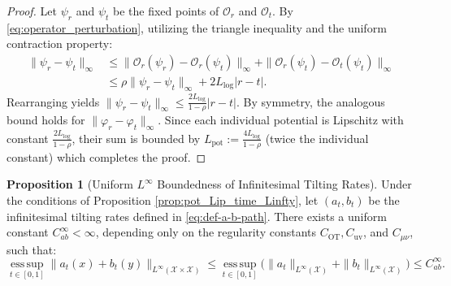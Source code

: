 \documentclass[11pt]{article}
\theoremstyle{definition}
\newtheorem{proposition}[theorem]{Proposition}
\numberwithin{equation}{section}%
\begin{document}
{\begin{proof}
Let $\psi_r$ and $\psi_t$ be the fixed points of $\mathcal{O}_r$ and $\mathcal{O}_t$. By \eqref{eq:operator_perturbation}, utilizing the triangle inequality and the uniform contraction property:
\begin{align*}
\|\psi_r - \psi_t\|_\infty &\le \|\mathcal{O}_r(\psi_r) - \mathcal{O}_r(\psi_t)\|_\infty + \|\mathcal{O}_r(\psi_t) - \mathcal{O}_t(\psi_t)\|_\infty \\
&\le \rho \|\psi_r - \psi_t\|_\infty + 2 L_{\log} |r - t|.
\end{align*}
Rearranging yields $\|\psi_r - \psi_t\|_\infty \le \frac{2 L_{\log}}{1 - \rho} |r - t|$. By symmetry, the analogous bound holds for $\|\varphi_r - \varphi_t\|_\infty$. Since each individual potential is Lipschitz with constant $\frac{2L_{\log}}{1-\rho}$, their sum is bounded by $L_{\mathrm{pot}} := \frac{4 L_{\log}}{1 - \rho}$ (twice the individual constant) which completes the proof.
\end{proof}

\begin{proposition}[Uniform $L^\infty$ Boundedness of Infinitesimal Tilting Rates]
\label{prop:ab_uniform_Linfty}
Under the conditions of Proposition \ref{prop:pot_Lip_time_Linfty}, let $(a_t, b_t)$ be the infinitesimal tilting rates defined in \eqref{eq:def-a-b-path}. There exists a uniform constant $C_{ab}^\infty < \infty$, depending only on the regularity constants $C_\mathrm{OT}, C_\mathrm{uv}$, and $C_{\mu\nu}$, such that:
\begin{equation*}
\operatorname*{ess\,sup}_{t\in[0,1]} \|a_t(x) + b_t(y)\|_{L^\infty(\mathcal{X} \times \mathcal{X})} \le \operatorname*{ess\,sup}_{t\in[0,1]} \Big( \|a_t\|_{L^\infty(\mathcal{X})} + \|b_t\|_{L^\infty(\mathcal{X})} \Big) \le C_{ab}^\infty.
\end{equation*}
\end{proposition}


}
\end{document}

